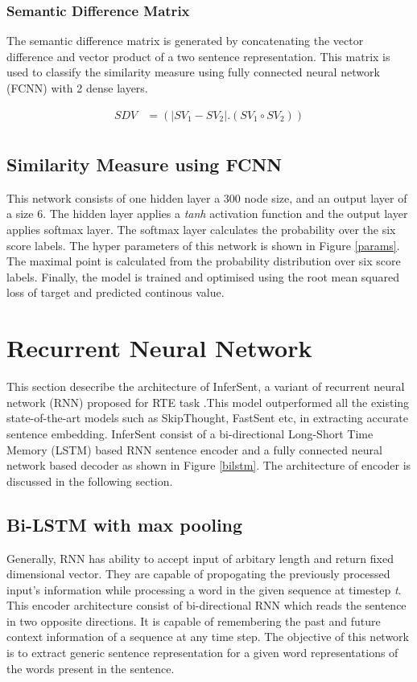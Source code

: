 \documentclass[12pt]{report} %
\begin{document}
	
	\subsubsection*{Semantic Difference Matrix}
	The semantic difference matrix is generated by concatenating the vector difference and vector product of a two sentence representation. This matrix is used to classify the similarity measure using fully connected neural network (FCNN) with 2 dense layers. 
	
		\begin{align*} 
			SDV & =(|SV_{1}- SV_{2}|.(SV_{1} \circ SV_{2})) \\
		\end{align*}
	
	\subsection{Similarity Measure using FCNN}
	
	 This network consists of one hidden layer a 300 node size, and an output layer of a size 6. The hidden layer applies a \textit{tanh} activation function and the output layer applies softmax layer. The softmax layer calculates the probability over the six score labels. The hyper parameters of this network is shown in Figure \ref{params}.
	 The maximal point is calculated from the probability distribution over six score labels. Finally, the model is trained and optimised using the root mean squared loss of target and predicted continous value. 
	 
	 \section{Recurrent Neural Network}
	 This section desecribe the architecture of InferSent, a variant of recurrent neural network (RNN) proposed for RTE task \citep{conneau2017supervised}.This model outperformed all the existing state-of-the-art models such as SkipThought, FastSent etc, in extracting accurate sentence embedding. InferSent consist of a bi-directional Long-Short Time Memory (LSTM) based RNN sentence encoder and a fully connected neural network based decoder as shown in Figure \ref{bilstm}. The architecture of encoder is discussed in the following section. 
	 
	\subsection{Bi-LSTM with max pooling}
	Generally, RNN has ability to accept input of arbitary length and return fixed dimensional vector. They are capable of propogating the previously processed input's information while processing a word in the given sequence at timestep \textit{t}.
	This encoder architecture consist of bi-directional RNN which reads the sentence in two opposite directions. It is capable of remembering the past and future context information of a sequence at any time step. The objective of this network is to extract generic sentence representation for a given word representations of the words present in the sentence.  
	
\end{document}
